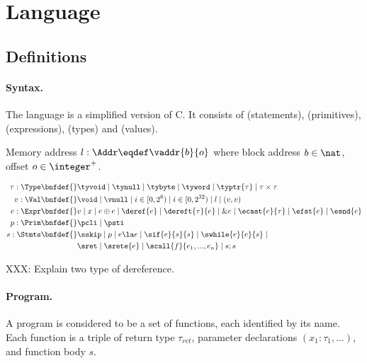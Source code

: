 \section{Language}
\label{sec:language}

\subsection{Definitions}

\paragraph{Syntax.}\label{p:type}

The language is a simplified version of C. It consists of \Stmts{} (statements), \Prim{} (primitives),
\Expr{} (expressions), \Type{} (types) and \Val{} (values).

Memory address $l: \Addr \eqdef \vaddr{b}{o}$ where block address $b \in \nat$, offset $o \in \integer^{+}$.

\begin{align*}
    \tau : \Type \bnfdef{}&
        \tyvoid \mid \tynull \mid \tybyte \mid \tyword \mid \typtr{\tau} \mid \tau \times \tau
\\
    v : \Val \bnfdef{}&
        \void \mid \vnull \mid i \in [0, 2^8) \mid i \in [0, 2^{32}) \mid l \mid (v, v)
\\
    e : \Expr \bnfdef{}&
        v \mid x \mid e \oplus e \mid \deref{e} \mid \dereft{\tau}{e} \mid \& e \mid \ecast{e}{\tau} \mid \efst{e} \mid \esnd{e}
\\
    p : \Prim \bnfdef{}&
        \pcli \mid \psti
\\
    s : \Stmts \bnfdef{}&
        \sskip \mid p \mid e \la e \mid \sif{e}{s}{s} \mid \swhile{e}{e}{s} \mid \\&
        \sret \mid \srete{e} \mid \scall{f}{e_1, ..., e_n} \mid s ; s
\\
\end{align*}

XXX: Explain two type of dereference.

\paragraph{Program.}

A program is considered to be a set of functions, each identified by its name. Each
function is a triple of return type $\tau_{ret}$, parameter declarations $(x_1 : \tau_1, ...)$,
and function body $s$.

